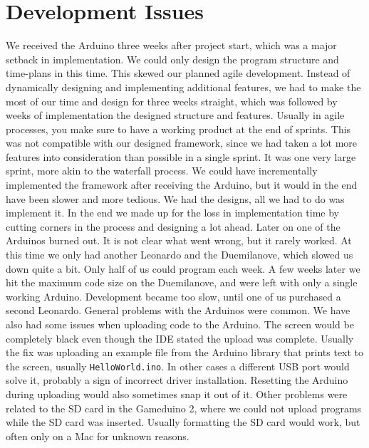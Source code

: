 \section{Development Issues} %
We received the Arduino three weeks after project start, which was a major setback in implementation. We could only design the program structure and time-plans in this time. This skewed our planned agile development. Instead of dynamically designing and implementing additional features, we had to make the most of our time and design for three weeks straight, which was followed by weeks of implementation the designed structure and features. Usually in agile processes, you make sure to have a working product at the end of sprints. This was not compatible with our designed framework, since we had taken a lot more features into consideration than possible in a single sprint. It was one very large sprint, more akin to the waterfall process. We could have incrementally implemented the framework after receiving the Arduino, but it would in the end have been slower and more tedious. We had the designs, all we had to do was implement it. In the end we made up for the loss in implementation time by cutting corners in the process and designing a lot ahead.
\newline
Later on one of the Arduinos burned out. It is not clear what went wrong, but it rarely worked. At this time we only had another Leonardo and the Duemilanove, which slowed us down quite a bit. Only half of us could program each week. A few weeks later we hit the maximum code size on the Duemilanove, and were left with only a single working Arduino. Development became too slow, until one of us purchased a second Leonardo.
\newline
General problems with the Arduinos were common. We have also had some issues when uploading code to the Arduino. The screen would be completely black even though the IDE stated the upload was complete. Usually the fix was uploading an example file from the Arduino library that prints text to the screen, usually {\tt HelloWorld.ino}. In other cases a different USB port would solve it, probably a sign of incorrect driver installation. Resetting the Arduino during uploading would also sometimes snap it out of it. Other problems were related to the SD card in the Gameduino 2, where we could not upload programs while the SD card was inserted. Usually formatting the SD card would work, but often only on a Mac for unknown reasons.
